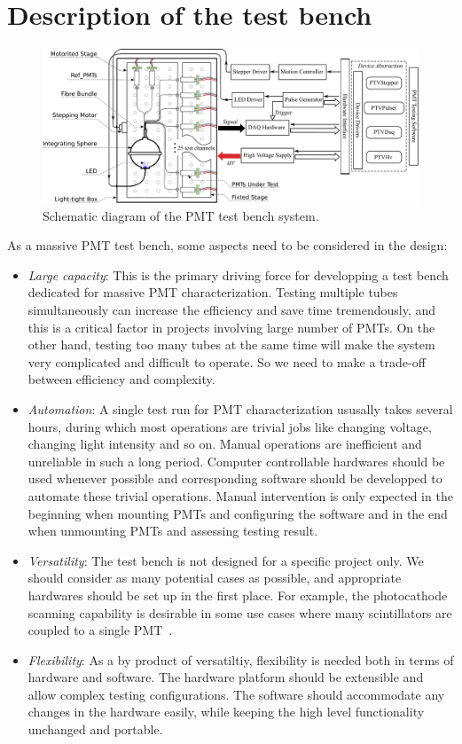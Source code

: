 \documentclass[review, times]{elsarticle}
\begin{document}
\section{Description of the test bench}
\label{sec:description}

\begin{figure}
 \centering
 \includegraphics[width=140mm]{testbench_overview}
\caption{Schematic diagram of the PMT test bench system.}
\label{fig:testbench_overveiw}
\end{figure}

As a massive PMT test bench, some aspects need to be considered in the design:
\begin{itemize}
 \item \textit{Large capacity}: This is the primary driving force for developping a test bench dedicated for massive PMT characterization.
 Testing multiple tubes simultaneously can increase the efficiency and save time tremendously, and this is a critical factor in projects involving large number of PMTs. 
 On the other hand, testing too many tubes at the same time will make the system very complicated and difficult to operate. 
 So we need to make a trade-off between efficiency and complexity.
 \item \textit{Automation}: A single test run for PMT characterization ususally takes several hours, during which most operations are trivial jobs like changing voltage, changing light intensity and so on.
 Manual operations are inefficient and unreliable in such a long period.
 Computer controllable hardwares should be used whenever possible and corresponding software should be developped to automate these trivial operations.
 Manual intervention is only expected in the beginning when mounting PMTs and configuring the software and in the end when unmounting PMTs and assessing testing result. 
 \item \textit{Versatility}: The test bench is not designed for a specific project only.
 We should consider as many potential cases as possible, and appropriate hardwares should be set up in the first place.
 For example, the photocathode scanning capability is desirable in some use cases where many scintillators are coupled to a single PMT~\cite{tof_pet}. 
 \item \textit{Flexibility}: As a by product of versatiltiy, flexibility is needed both in terms of hardware and software.
 The hardware platform should be extensible and allow complex testing configurations.
 The software should accommodate any changes in the hardware easily, while keeping the high level functionality unchanged and portable. 
\end{itemize}
\end{document}
